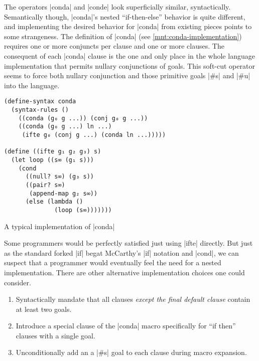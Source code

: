 \documentclass[sigplan,draft,natbib=false]{acmart}
\begin{document}
The operators \rackinline|conda| and \rackinline|conde| look
superficially similar, syntactically. Semantically though,
\rackinline|conda|'s nested \enquote{if-then-else} behavior is quite
different, and implementing the desired behavior for
\rackinline|conda| from existing pieces points to some strangeness.
The definition of \rackinline|conda| (see
\cref{mnt:conda-implementation}) requires one or more conjuncts per
clause and one or more clauses. The consequent of each
\rackinline|conda| clause is the one and only place in the whole
language implementation that permits nullary conjunctions of goals.
This soft-cut operator seems to force both nullary conjunction and
those primitive goals \rackinline|#s| and \rackinline|#u| into the
language.

\begin{listing}
  \begin{verbatim}
(define-syntax conda
  (syntax-rules ()
    ((conda (g₀ g ...)) (conj g₀ g ...))
    ((conda (g₀ g ...) ln ...)
     (ifte g₀ (conj g ...) (conda ln ...)))))

(define ((ifte g₁ g₂ g₃) s)
  (let loop ((s∞ (g₁ s)))
    (cond
      ((null? s∞) (g₃ s))
      ((pair? s∞)
       (append-map g₂ s∞))
      (else (lambda ()
              (loop (s∞)))))))
  \end{verbatim}
  \caption{A typical implementation of \rackinline|conda|}
  \label{mnt:conda-implementation}
\end{listing}

Some programmers would be perfectly satisfied just using
\rackinline|ifte| directly. But just as the standard forked
\rackinline|if| begat McCarthy's \rackinline|if| notation and
\rackinline|cond|, we can suspect that a programmer would eventually
feel the need for a nested implementation. There are other alternative
implementation choices one could consider.

\begin{enumerate}

\item Syntactically mandate that all clauses \emph{except the final
    default clause} contain at least two goals.

\item Introduce a special clause of the \rackinline|conda| macro
  specifically for \enquote{if then} clauses with a single goal.

\item Unconditionally add an a \rackinline|#s| goal to each clause
  during macro expansion.

\end{enumerate}
\end{document}
